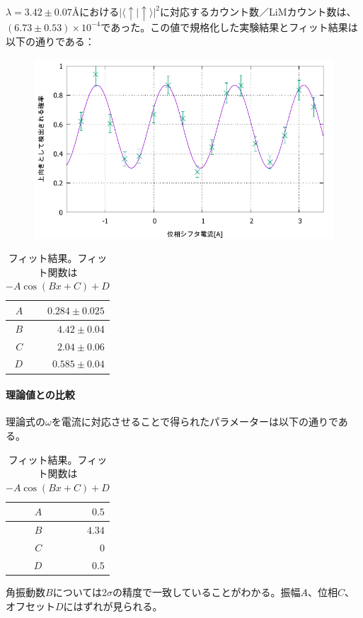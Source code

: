 $\lambda=3.42\pm0.07$Åにおける$|\langle\uparrow|\uparrow\rangle|^2$に対応するカウント数／LiMカウント数は、
$(6.73\pm0.53)\times10^{-4}$であった。この値で規格化した実験結果とフィット結果は以下の通りである：
\begin{figure}[H]
\centering
\includegraphics{phase_shifter/highest.pdf}
\end{figure}
\begin{table}[H]
\centering
\begin{tabular}{|r|r|}
\hline
$A$&$0.284\pm0.025$\\
\hline
$B$&$4.42\pm$0.04\\
\hline
$C$&$2.04\pm0.06$\\
\hline
$D$&$0.585\pm0.04$\\
\hline
\end{tabular}
\caption{フィット結果。フィット関数は$-A\cos(Bx+C)+D$}
\end{table}

\paragraph{理論値との比較}
理論式の$\omega$を電流に対応させることで得られたパラメーターは以下の通りである。
\begin{table}[H]
\centering
\begin{tabular}{|r|r|}
\hline
$A$&$0.5$\\
\hline
$B$&$4.34$\\
\hline
$C$&$0$\\
\hline
$D$&$0.5$\\
\hline
\end{tabular}
\caption{フィット結果。フィット関数は$-A\cos(Bx+C)+D$}
\end{table}
角振動数$B$については$2\sigma$の精度で一致していることがわかる。振幅$A$、位相$C$、オフセット$D$にはずれが見られる。


\endgroup